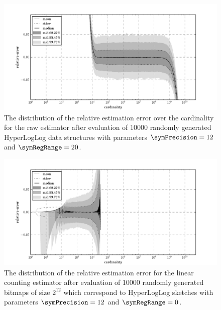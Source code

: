 \documentclass[a4paper]{scrartcl}
\begin{document}
\begin{figure}
\centering
\includegraphics[width=1\textwidth]{raw_estimate}
\caption{The distribution of the relative estimation error over the cardinality for the raw estimator after evaluation of \num{10000} randomly generated HyperLogLog data structures with parameters $\symPrecision = 12$ and $\symRegRange=20$.}
\label{fig:raw_estimate}
\end{figure}

\begin{figure}
\centering
\includegraphics[width=1\textwidth]{small_range_estimate}
\caption{The distribution of the relative estimation error for the linear counting estimator after evaluation of \num{10000} randomly generated bitmaps of size $2^{12}$ which correspond to HyperLogLog sketches with parameters $\symPrecision = 12$ and $\symRegRange=0$.}
\label{fig:small_range_estimate}
\end{figure}
\end{document}
